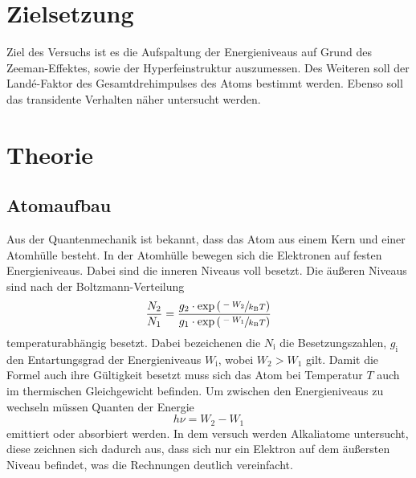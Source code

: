 \section{Zielsetzung}
\label{sec:Zielsetzung}
Ziel des Versuchs ist es die Aufspaltung der Energieniveaus auf Grund des Zeeman-Effektes,
sowie der Hyperfeinstruktur auszumessen. Des Weiteren soll der Landé-Faktor des Gesamtdrehimpulses
des Atoms bestimmt werden. Ebenso soll das transidente Verhalten näher untersucht werden.

\section{Theorie}
\label{sec:Theorie}
\subsection{Atomaufbau}
\label{sec:atomaufbau}
Aus der Quantenmechanik ist bekannt, dass das Atom aus einem Kern und einer Atomhülle besteht.
In der Atomhülle bewegen sich die Elektronen auf festen Energieniveaus. Dabei sind die inneren
Niveaus voll besetzt. Die äußeren Niveaus sind nach der Boltzmann-Verteilung
\begin{equation}
  \label{eqn:boltz}
  \frac{N_2}{N_1} = \frac{g_2 \cdot \exp{\left(\sfrac{-W_2}{k_\text{B}T}\right)}}{g_1 \cdot \exp{\left(\sfrac{-W_1}{k_\text{B}T}\right)}}
\end{equation}
tem­pe­ra­tur­ab­hän­gig besetzt. Dabei bezeichenen die $N_\text{i}$ die Besetzungszahlen, $g_\text{i}$ den Entartungsgrad
der Energieniveaus $W_\text{i}$, wobei $W_2 > W_1$ gilt. Damit die Formel auch ihre Gültigkeit besetzt
muss sich das Atom bei Temperatur $T$ auch im thermischen Gleichgewicht befinden.
Um zwischen den Energieniveaus zu wechseln müssen Quanten der Energie
\begin{equation*}
  h \nu = W_2 - W_1
\end{equation*}
emittiert oder absorbiert werden. 
In dem versuch werden Alkaliatome untersucht, diese zeichnen sich dadurch aus, dass sich nur ein 
Elektron auf dem äußersten Niveau befindet, was die Rechnungen deutlich vereinfacht.

